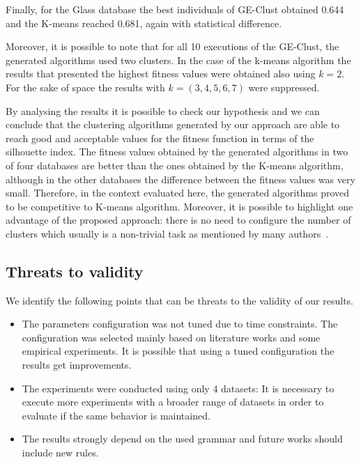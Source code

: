 \documentclass[conference,compsoc]{IEEEtran}
\begin{document}
Finally, for the Glass database the best individuals of GE-Clust obtained 0.644 and the K-means reached 0.681, again with statistical difference.

Moreover, it is possible to note that for all 10 executions of the GE-Clust, the generated algorithms used two clusters. In the case of the k-means algorithm the results that presented the highest fitness values were obtained also using $k=2$. For the sake of space the results with $k = (3,4,5,6,7)$ were suppressed.

By analysing the results it is possible to check our hypothesis and we can conclude that the clustering algorithms generated by our approach are able to reach good and acceptable values for the fitness function in terms of  the silhouette index. The fitness values obtained by the generated algorithms in two of four databases are better than the ones obtained by the K-means algorithm, although in the other databases the difference between the fitness values was very small. Therefore, in the context evaluated here, the generated algorithms proved to be competitive to K-means algorithm. Moreover, it is possible to highlight one advantage of the proposed approach: there is no need to configure the number of clusters which usually is a non-trivial task as mentioned by many authors~\cite{pham2005selection, yan2005methods, tibshirani2001estimating}.


\subsection{Threats to validity}

We identify the following points that can be threats to the validity of our results.
\begin{itemize}
	\item The parameters configuration was not tuned due to time constraints. The configuration was selected mainly based on literature works and some empirical experiments. It is possible that using a tuned configuration the results get improvements.
	\item The experiments were conducted using only 4 datasets: It is necessary to execute more experiments with a broader range of datasets in order to evaluate if the same behavior is maintained.
	\item The results strongly depend on the used grammar and future works should include new rules.
\end{itemize}
\end{document}
